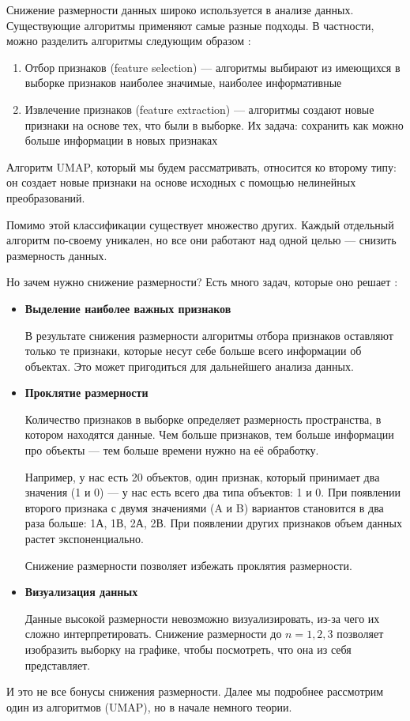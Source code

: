 Снижение размерности данных широко используется в анализе данных. Существующие алгоритмы применяют самые разные подходы. В частности, можно разделить алгоритмы следующим образом \cite{reducebasics}:
\begin{enumerate}
	\item Отбор признаков (feature selection) --- алгоритмы выбирают из имеющихся в выборке признаков наиболее значимые, наиболее информативные
	\item Извлечение признаков (feature extraction) --- алгоритмы создают новые признаки на основе тех, что были в выборке. Их задача: сохранить как можно больше информации в новых признаках
\end{enumerate}

Алгоритм UMAP, который мы будем рассматривать, относится ко второму типу: он создает новые признаки на основе исходных с помощью нелинейных преобразований.

Помимо этой классификации существует множество других. Каждый отдельный алгоритм по-своему уникален, но все они работают над одной целью --- снизить размерность данных.

Но зачем нужно снижение размерности? Есть много задач, которые оно решает \cite{reducebasics}:
\begin{itemize}
	\item \textbf{Выделение наиболее важных признаков}
	
	В результате снижения размерности алгоритмы отбора признаков оставляют только те признаки, которые несут себе больше всего информации об объектах. Это может пригодиться для дальнейшего анализа данных.
	
	\item \textbf{Проклятие размерности}
	
	Количество признаков в выборке определяет размерность пространства, в котором находятся данные. Чем больше признаков, тем больше информации про объекты --- тем больше времени нужно на её обработку.
	
	Например, у нас есть 20 объектов, один признак, который принимает два значения (1 и 0) --- у нас есть всего два типа объектов: 1 и 0. При появлении второго признака с двумя значениями (A и B) вариантов становится в два раза больше: 1А, 1В, 2А, 2В. При появлении других признаков объем данных растет экспоненциально.
	
	Снижение размерности позволяет избежать проклятия размерности.
	
	\item \textbf{Визуализация данных}
	
	Данные высокой размерности невозможно визуализировать, из-за чего их сложно интерпретировать. Снижение размерности до $n=1,2,3$ позволяет изобразить выборку на графике, чтобы посмотреть, что она из себя представляет.
\end{itemize}

И это не все бонусы снижения размерности. Далее мы подробнее рассмотрим один из алгоритмов (UMAP), но в начале немного теории.